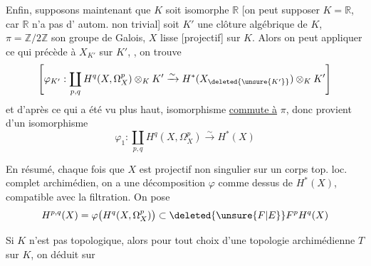 Enfin, supposons maintenant que $K$ soit isomorphe
$\mathbb R$ [on peut supposer $K=\mathbb R$, car $\mathbb R$ n'a pas d'
autom. non trivial] soit $K'$ une clôture
algébrique de $K$, $\pi=\mathbb Z/2\mathbb Z$ son groupe de Galois,
$X$ lisse  [projectif] sur $K$. Alors on peut appliquer
ce qui précède à $X_{K'}$ sur $K'$,
, on trouve
\[
\left[\varphi_{K'}:\coprod_{p,q}H^q(X,\Omega_X^p)\otimes_K K'
 \xrightarrow{\sim}H^*(X_{\deleted{\unsure{K'}}})\otimes_K K'\right]
\]
et d'après ce qui a été vu plus haut,
 isomorphisme \uline{commute à} $\pi$, donc provient
d'un isomorphisme
\[
 \varphi_1:\coprod_{p,q} H^q(X,\Omega_X^p)\xrightarrow{\sim}H^*(X)
\]


En résumé, chaque fois que $X$ est
projectif non singulier sur un corps
 top. loc.  complet archimédien,
on a une décomposition $\varphi$ comme
dessus de $H^*(X)$, compatible avec la
filtration.  On pose
\[
H^{p,q}(X)=\varphi\big(H^q(X,\Omega_X^p)\big)\subset \deleted{\unsure{F|E}}F^p H^q(X)
\]

Si $K$ n'est pas topologique, alors pour
tout choix d'une topologie  archimédienne
$T$ sur $K$, on déduit sur
